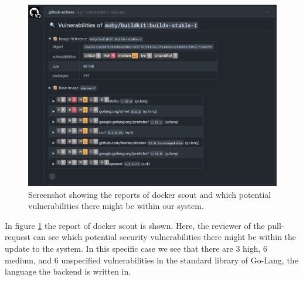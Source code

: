 \begin{figure}[H]
    \centering
    \includegraphics[width=.8\linewidth]{img/dockerScoutReport.png}
    \caption{Screenshot showing the reports of docker scout and which potential vulnerabilities there might be within our system.}
    \label{fig:docker scout report}
\end{figure}
In figure \ref{fig:docker scout report} the report of docker scout is shown. Here, the reviewer of the pull-request can see which potential security vulnerabilities there might be within the update to the system. In this specific case we see that there are 3 high, 6 medium, and 6 unspecified vulnerabilities in the standard library of Go-Lang, the language the backend is written in.

